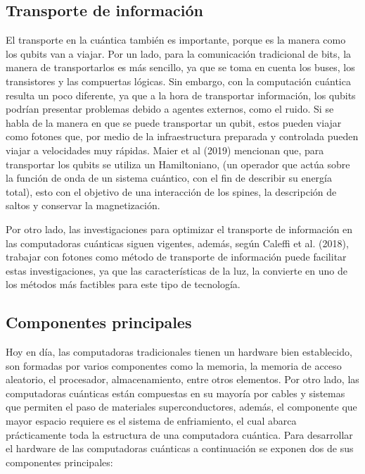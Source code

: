 \documentclass{article}
\begin{document}
\subsection{Transporte de información}
El transporte en la cuántica también es importante, porque es la manera como los qubits van a viajar. Por un lado, para la comunicación tradicional de bits, la manera de transportarlos es más sencillo, ya que se toma en cuenta los buses, los transistores y las compuertas lógicas. Sin embargo, con la computación cuántica resulta un poco diferente, ya que a la hora de transportar información, los qubits podrían presentar problemas debido a agentes externos, como el ruido.
Si se habla de la manera en que se puede transportar un qubit, estos pueden viajar como fotones que, por medio de la infraestructura preparada y controlada pueden viajar a velocidades muy rápidas. Maier et al (2019) mencionan que, para transportar los qubits se utiliza un Hamiltoniano, (un operador que actúa sobre la función de onda de un sistema cuántico, con el fin de describir su energía total), esto con el objetivo de una interacción de los spines, la descripción de saltos y conservar la magnetización.

Por otro lado, las investigaciones para optimizar el transporte de información en las computadoras cuánticas siguen vigentes, además, según Caleffi et al. (2018), trabajar con fotones como método de transporte de información puede facilitar estas investigaciones, ya que las características de la luz, la convierte en uno de los métodos más factibles para este tipo de tecnología.

\subsection{Componentes principales}
Hoy en día, las computadoras tradicionales tienen un hardware bien establecido, son formadas por varios componentes como la memoria, la memoria de acceso aleatorio, el procesador, almacenamiento, entre otros elementos.
Por otro lado, las computadoras cuánticas están compuestas en su mayoría por cables y sistemas que permiten el paso de materiales superconductores, además, el componente que mayor espacio requiere es el sistema de enfriamiento, el cual abarca prácticamente toda la estructura de una computadora cuántica. Para desarrollar el hardware de las computadoras cuánticas a continuación se exponen dos de sus componentes principales:
\end{document}
